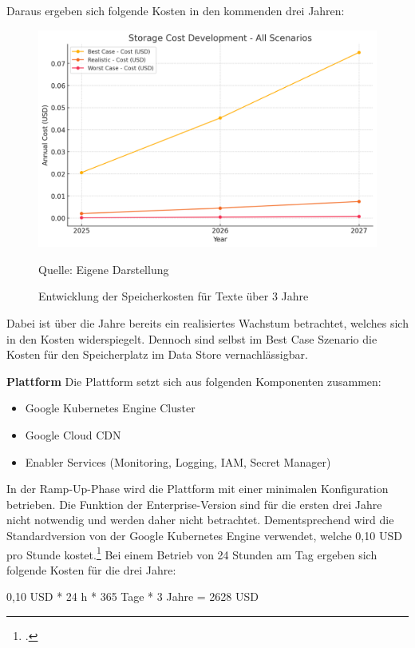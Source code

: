Daraus ergeben sich folgende Kosten in den kommenden drei Jahren:
\begin{figure}[htbp]
    \includegraphics[width=\textwidth, height=\textheight, keepaspectratio]{abbildungen/Kosten_Speicher_Text}
    \caption{Entwicklung der Speicherkosten für Texte über 3 Jahre}
    \label{fig:KostenentwicklungSpeicherText}
    \raggedright Quelle: Eigene Darstellung
\end{figure}

Dabei ist über die Jahre bereits ein realisiertes Wachstum betrachtet, welches sich in den Kosten widerspiegelt.
Dennoch sind selbst im Best Case Szenario die Kosten für den Speicherplatz im Data Store vernachlässigbar.

\textbf{Plattform}\newline
Die Plattform setzt sich aus folgenden Komponenten zusammen:
\begin{itemize}
    \item Google Kubernetes Engine Cluster
    \item Google Cloud CDN
    \item Enabler Services (Monitoring, Logging, IAM, Secret Manager)
\end{itemize}

In der Ramp-Up-Phase wird die Plattform mit einer minimalen Konfiguration betrieben.
Die Funktion der Enterprise-Version sind für die ersten drei Jahre nicht notwendig und werden daher nicht betrachtet.
Dementsprechend wird die Standardversion von der Google Kubernetes Engine verwendet, welche 0,10 USD pro Stunde kostet.\footcite{GoogleKubernetesEnginePricing2025}
Bei einem Betrieb von 24 Stunden am Tag ergeben sich folgende Kosten für die drei Jahre:

0,10 USD * 24 h * 365 Tage * 3 Jahre = 2628 USD


